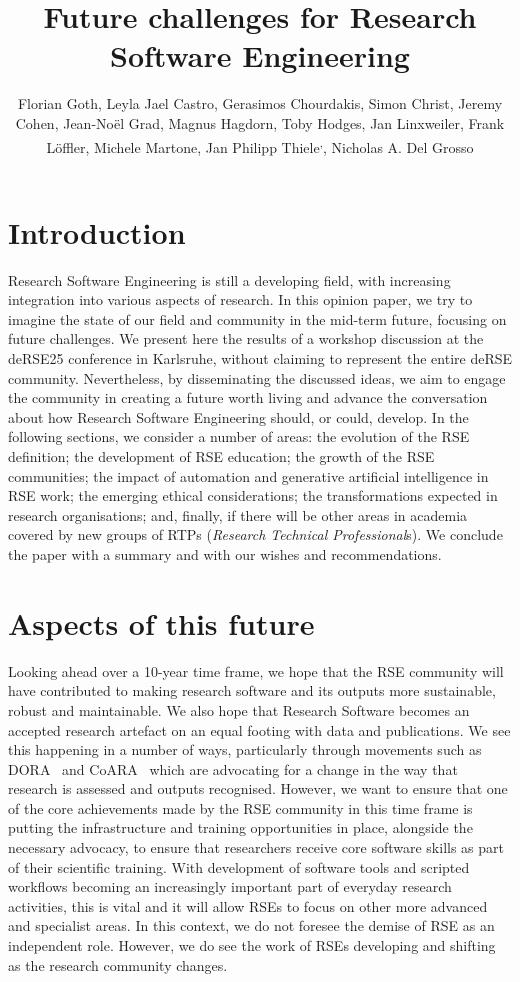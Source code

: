 \documentclass{eceasst}
\title{Future challenges for Research Software Engineering} %
\author{
Florian Goth\authorRef{1},
Leyla Jael Castro\authorRef{2},
Gerasimos Chourdakis\authorRef{3},
Simon Christ\authorRef{4},
Jeremy Cohen\authorRef{5},
Jean-Noël Grad\authorRef{6},
Magnus Hagdorn\authorRef{7},
Toby Hodges\authorRef{8},
Jan Linxweiler\authorRef{9},
Frank Löffler\authorRef{10},
Michele Martone\authorRef{11},
Jan Philipp Thiele\authorRef{9}\textsuperscript{,}\authorRef{12},
Nicholas A. Del Grosso\authorRef{13}
} %
\institute{%
\autlabel{1} Institut für theoretische Physik 1, University of Würzburg, 97074, Würzburg, Germany\par
\autlabel{2} ZB MED Information Centre for Life Sciences, Cologne, Germany\par
\autlabel{3} Institute for Parallel and Distributed Systems, University of Stuttgart, Stuttgart, Germany\par
\autlabel{4} Leibniz University Hannover, Department of Cell Biology and Biophysics, Computational Biology, Germany\par
\autlabel{5} Imperial College London, London, UK\par
\autlabel{6} Institute for Computational Physics, University of Stuttgart, Germany\par
\autlabel{7} Geschäftsbereich IT, Charité Universitätsmedizin Berlin, Germany\par
\autlabel{8} The Carpentries, USA\par
\autlabel{9} Technische Universität Braunschweig, Germany\par
\autlabel{10} Michael Stifel Center Jena {\&} Friedrich Schiller University Jena, Germany\par
\autlabel{11} Leibniz Supercomputing Centre, Garching, Germany\par
\autlabel{12} Weierstrass Institute, Berlin, Germany;
              Leibniz University Hannover, Institute of Applied Mathematics, Scientific Computing, Hannover, Germany\par
\autlabel{13} Institute for Experimental Epileptology and Cognition Research, Uniklinikum Bonn, Germany
}
\begin{document}
\maketitle

\section{Introduction}

Research Software Engineering is still a developing field,
with increasing integration into various aspects of research.
In this opinion paper, we try to imagine the state of our field
and community in the mid-term future, focusing on future challenges.
We present here the results of a workshop discussion at the
deRSE25 conference in Karlsruhe\cite{Goth2025EndRSEng}, without
claiming to represent the entire deRSE community.
Nevertheless, by disseminating the discussed ideas,
we aim to engage the community in creating a future worth living
and advance the conversation about how Research Software Engineering should, or could, develop.
In the following sections, we consider a number of areas:
the evolution of the RSE definition;
the development of RSE education;
the growth of the RSE communities;
the impact of automation and generative artificial intelligence in RSE work;
the emerging ethical considerations;
the transformations expected in research organisations;
and, finally, if there will be other areas in academia covered by new groups of RTPs (\emph{Research Technical Professional}s).
We conclude the paper with a summary and with our wishes and recommendations.

\section{Aspects of this future}
Looking ahead over a 10-year time frame, we hope that the RSE community will have
contributed to making research software and its outputs
more sustainable, robust and maintainable.
We also hope that Research Software becomes an accepted research artefact on an equal footing with data and publications.
We see this happening in a number of ways,
particularly through movements such as DORA~\cite{DORA} and CoARA~\cite{COARA} which are advocating for a change in the way that research is assessed and outputs recognised.
However, we want to ensure that one of the core achievements made by the RSE community in this time
frame is putting the infrastructure and training opportunities in place, alongside the necessary
advocacy, to ensure that researchers receive core software skills as part of their scientific training.
With development of software tools and scripted workflows becoming an increasingly important part of everyday
research activities, this is vital and it will allow RSEs to focus on other more advanced and specialist
areas. In this context, we do not foresee the demise of RSE as an independent role. However, we
do see the work of RSEs developing and shifting as the research community changes.
\end{document}
